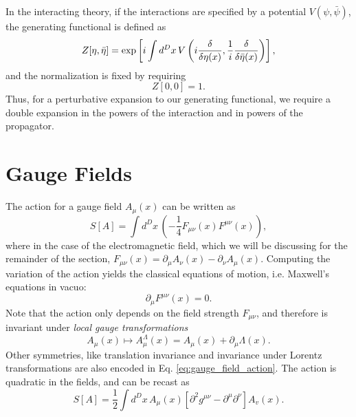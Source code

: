 \documentclass{article}
\numberwithin{equation}{section}
\begin{document}
In the interacting theory, if the interactions are specified by a potential $V(\psi, \bar{\psi})$, the generating functional is defined as 
\begin{equation}
    Z[\eta, \bar{\eta}] = \exp\left[i \int d^Dx \, V\left(i \fdv{\eta(x)}, \frac{1}{i} \fdv{\bar{\eta}(x)}\right)\right],
\end{equation}
and the normalization is fixed by requiring 
\begin{equation}
    Z[0,0] = 1.
\end{equation}
Thus, for a perturbative expansion to our generating functional, we require a double expansion in the powers of the interaction and in powers of the propagator.

\section{Gauge Fields}

The action for a gauge field $A_\mu(x)$ can be written as 
\begin{equation} \label{eq:gauge_field_action}
    S[A] = \int d^Dx \, \left(-\frac{1}{4}F_{\mu\nu}(x)F^{\mu\nu}(x)\right),
\end{equation}
where in the case of the electromagnetic field, which we will be discussing for the remainder of the section, $F_{\mu\nu}(x) = \partial_\mu A_\nu(x) - \partial_\nu A_\mu(x)$. Computing the variation of the action yields the classical equations of motion, i.e. Maxwell's equations in vacuo:
\begin{equation}
    \partial_\mu F^{\mu\nu}(x) = 0.
\end{equation}
Note that the action only depends on the field strength $F_{\mu\nu}$, and therefore is invariant under \textit{local gauge transformations}
\begin{equation}
    A_\mu(x) \mapsto A_\mu^\Lambda(x) = A_\mu(x) + \partial_\mu \Lambda(x).
\end{equation}
Other symmetries, like translation invariance and invariance under Lorentz transformations are also encoded in Eq. \ref{eq:gauge_field_action}. The action is quadratic in the fields, and can be recast as 
\begin{equation}
    S[A] = \frac{1}{2}\int d^Dx \, A_\mu(x)[\partial^2 g^{\mu\nu} - \partial^\mu \partial^\nu]A_v(x).
\end{equation} %
\end{document}

